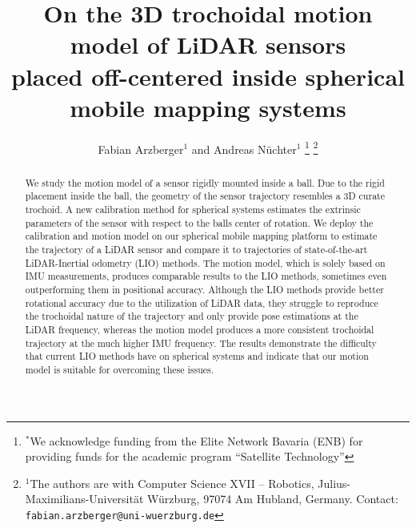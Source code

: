 \documentclass[letterpaper, 10pt, conference]{ieeeconf}      %
\title{\LARGE \bf
On the 3D trochoidal motion model of LiDAR sensors\\placed off-centered inside spherical mobile mapping systems
}
\author{Fabian Arzberger$^{1}$ and Andreas N{\"u}chter$^{1}$%
\thanks{$^{*}$We acknowledge funding from the Elite Network Bavaria (ENB) for providing funds for the academic program ``Satellite Technology''}%
\thanks{$^{1}$The authors are with Computer Science XVII -- Robotics,
        Julius-Maximilians-Universit{\"a}t W{\"u}rzburg, 97074 Am Hubland, Germany.
        {Contact: \tt\small fabian.arzberger@uni-wuerzburg.de}}%
}
\begin{document}
\maketitle
\thispagestyle{empty}
\pagestyle{empty}


\begin{abstract}
We study the motion model of a sensor rigidly mounted inside a ball.
Due to the rigid placement inside the ball, the geometry of the sensor trajectory resembles a 3D curate trochoid.
A new calibration method for spherical systems estimates the extrinsic parameters of the sensor with respect to the balls center of rotation.
We deploy the calibration and motion model on our spherical mobile mapping platform to estimate the trajectory of a LiDAR sensor and compare it to trajectories of state-of-the-art LiDAR-Inertial odometry (LIO) methods.
The motion model, which is solely based on IMU measurements, produces comparable results to the LIO methods, sometimes even outperforming them in positional accuracy.
Although the LIO methods provide better rotational accuracy due to the utilization of LiDAR data, they struggle to reproduce the trochoidal nature of the trajectory and only provide pose estimations at the LiDAR frequency, whereas the motion model produces a more consistent trochoidal trajectory at the much higher IMU frequency.
The results demonstrate the difficulty that current LIO methods have on spherical systems and indicate that our motion model is suitable for overcoming these issues. 
\end{abstract}













\end{document}
